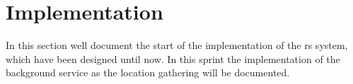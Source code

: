 \section{Implementation}
In this section well document the start of the implementation of the \gls{rs} system, which have been designed until now. 
In this sprint the implementation of the background service as the location gathering will be documented. 





